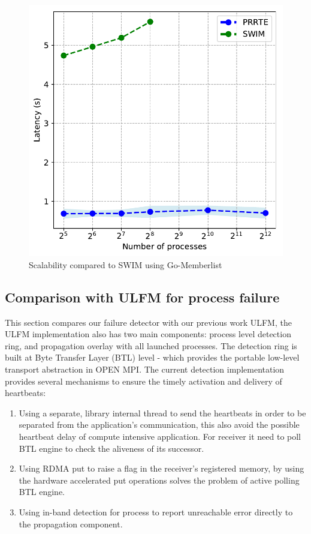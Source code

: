 \documentclass[sigconf]{acmart}
\begin{document}
\begin{figure}[h]
  \centering
  \includegraphics[width=\linewidth]{Scale_prrte_swim.pdf}
  \caption{Scalability compared to SWIM using Go-Memberlist}
\end{figure}

\subsection{Comparison with ULFM for process failure}
This section compares our failure detector with our previous work ULFM\cite{George18}, the ULFM implementation also has two main components: process level detection ring, and propagation overlay with all launched processes. The detection ring is built at Byte Transfer Layer (BTL) level - which provides the portable low-level transport abstraction in OPEN MPI. The current detection implementation provides several mechanisms to ensure the timely activation and delivery of heartbeats:
\begin{enumerate}
  \item Using a separate, library internal thread to send the heartbeats in order to be separated from the application's communication, this also avoid the possible heartbeat delay of compute intensive application. For receiver it need to poll BTL engine to check the aliveness of its successor. 
  \item Using RDMA put to raise a flag in the receiver's registered memory, by using the hardware accelerated put operations solves the problem of active polling BTL engine. 
  \item Using in-band detection for process to report unreachable error directly to the propagation component.
\end{enumerate}
\end{document}
